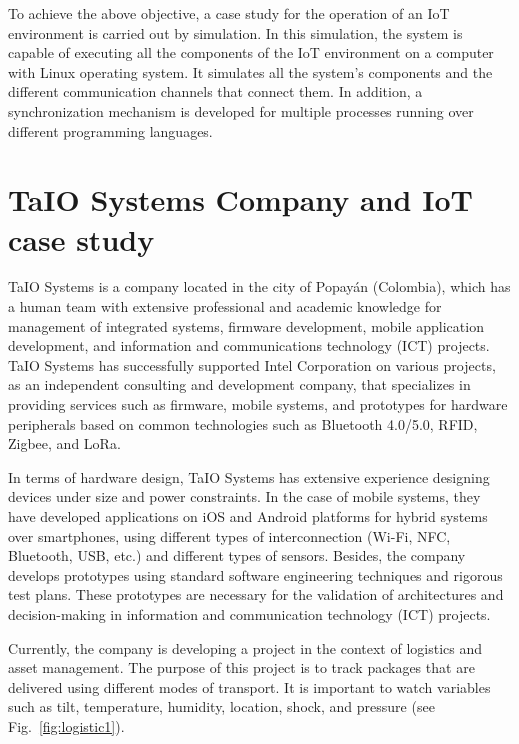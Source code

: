 \documentclass[journal]{IEEEtran}	%
\begin{document}
To achieve the above objective, a case study for the operation of an IoT environment is carried out by simulation. In this simulation, the system is capable of executing all the components of the IoT environment on a computer with Linux operating system. It simulates all the system's components and the different communication channels that connect them. In addition, a synchronization mechanism is developed for multiple processes running over different programming languages.



\section{TaIO Systems Company and IoT case study}


TaIO Systems is a company located in the city of Popayán (Colombia), which has a human team with extensive professional and academic knowledge for management of integrated systems, firmware development, mobile application development, and information and communications technology (ICT) projects. TaIO Systems has successfully supported Intel Corporation on various projects, as an independent consulting and development company, that specializes in providing services such as firmware, mobile systems, and prototypes for hardware peripherals based on common technologies such as Bluetooth 4.0/5.0, RFID, Zigbee, and LoRa.

In terms of hardware design, TaIO Systems has extensive experience designing devices under size and power constraints. In the case of mobile systems, they have developed applications on iOS and Android platforms for hybrid systems over smartphones, using different types of interconnection (Wi-Fi, NFC, Bluetooth, USB, etc.) and different types of sensors. Besides, the company develops prototypes using standard software engineering techniques and rigorous test plans. These prototypes are necessary for the validation of architectures and decision-making in information and communication technology (ICT) projects.

Currently, the company is developing a project in the context of logistics and asset management. The purpose of this project is to track packages that are delivered using different modes of transport. It is important to watch variables such as tilt, temperature, humidity, location, shock, and pressure (see Fig.~\ref{fig:logistic1}).
\end{document}
